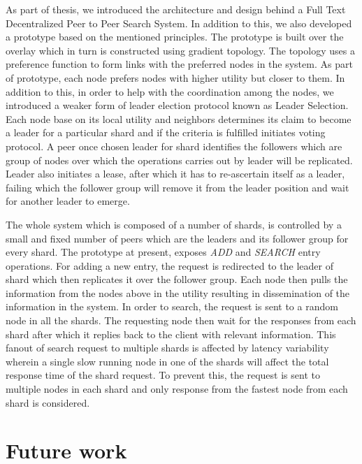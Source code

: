 \documentclass[12pt,a4paper,twoside,openright]{book}
\begin{document}
As part of thesis, we introduced the architecture and design behind a Full Text Decentralized Peer to Peer Search System. In addition to this, we also developed a prototype based on the mentioned principles. The prototype is built over the overlay which in turn is constructed using gradient topology. The topology uses a preference function to form links with the preferred nodes in the system. As part of prototype, each node prefers nodes with higher utility but closer to them. In addition to this, in order to help with the coordination among the nodes, we introduced a weaker form of leader election protocol known as Leader Selection. Each node base on its local utility and neighbors determines its claim to become a leader for a particular shard and if the criteria is fulfilled initiates voting protocol. A peer once chosen leader for shard identifies the followers which are group of nodes over which the operations carries out by leader will be replicated. Leader also initiates a lease, after which it has to re-ascertain itself as a leader, failing which the follower group will remove it from the leader position and wait for another leader to emerge.
\par The whole system which is composed of a number of shards, is controlled by a small and fixed number of peers which are the leaders and its follower group for every shard. The prototype at present, exposes \textit{ADD} and \textit{SEARCH} entry operations. For adding a new entry, the request is redirected to the leader of shard which then replicates it over the follower group. Each node then pulls the information from the nodes above in the utility resulting in dissemination of the information in the system. In order to search, the request is sent to a random node in all the shards. The requesting node then wait for the responses from each shard after which it replies back to the client with relevant information. This fanout of search request to multiple shards is affected by latency variability wherein a single slow running node in one of the shards will affect the total response time of the shard request. To prevent this, the request is sent to multiple nodes in each shard and only response from the fastest node from each shard is considered.

\section{Future work}
\label{sec:future-work}
\end{document}
